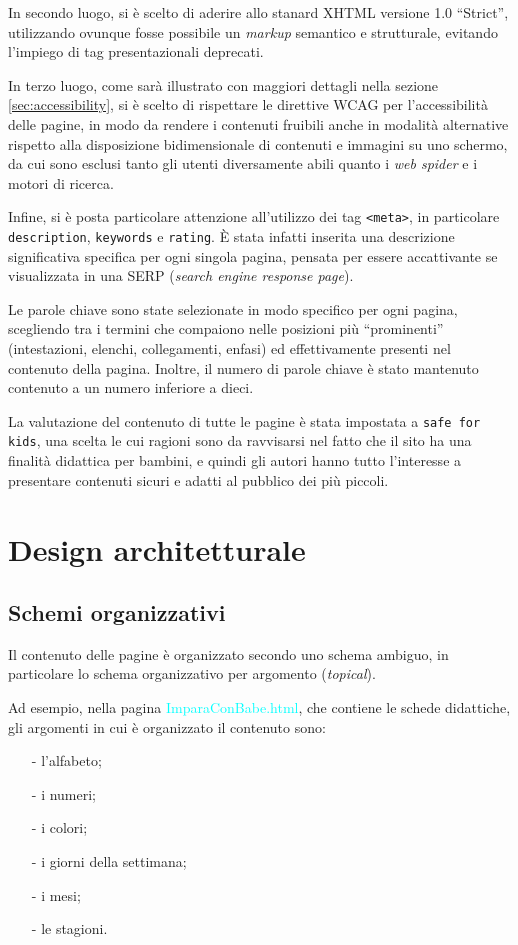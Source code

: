 \documentclass[10pt,a4paper,onecolumn]{article}
\newcommand{\sitepage}[1]{\textcolor{cyan}{\textsf{#1}}}
\newcommand{\inglese}[1]{\foreignlanguage{english}{\itshape{}#1}}
\begin{document}
In secondo luogo, si è scelto di aderire allo stanard XHTML versione 1.0 ``Strict'', utilizzando ovunque fosse possibile un \inglese{markup} semantico e strutturale, evitando l'impiego di tag presentazionali deprecati.


In terzo luogo, come sarà illustrato con maggiori dettagli nella sezione \ref{sec:accessibility}, si è scelto di rispettare le direttive WCAG per l'accessibilità delle pagine, in modo da rendere i contenuti fruibili anche in modalità alternative rispetto alla disposizione bidimensionale di contenuti e immagini su uno schermo, da cui sono esclusi tanto gli utenti diversamente abili quanto i \inglese{web spider} e i motori di ricerca.

Infine, si è posta particolare attenzione all'utilizzo dei tag \texttt{<meta>}, in particolare \texttt{description}, \texttt{keywords} e \texttt{rating}. È stata infatti inserita una descrizione significativa specifica per ogni singola pagina, pensata per essere accattivante se visualizzata in una SERP (\inglese{search engine response page}).

Le parole chiave sono state selezionate in modo specifico per ogni pagina, scegliendo tra i termini che compaiono nelle posizioni più ``prominenti'' (intestazioni, elenchi, collegamenti, enfasi) ed effettivamente presenti nel contenuto della pagina. Inoltre, il numero di parole chiave è stato mantenuto contenuto a un numero inferiore a dieci.

La valutazione del contenuto di tutte le pagine è stata impostata a \texttt{safe for kids}, una scelta le cui ragioni sono da ravvisarsi nel fatto che il sito ha una finalità didattica per bambini, e quindi gli autori hanno tutto l'interesse a presentare contenuti sicuri e adatti al pubblico dei più piccoli.

\section{Design architetturale}
\subsection{Schemi organizzativi}
Il contenuto delle pagine è organizzato secondo uno schema ambiguo, in particolare lo schema organizzativo per argomento (\inglese{topical}).

Ad esempio, nella pagina \sitepage{ImparaConBabe.html}, che contiene le schede didattiche, gli argomenti in cui è organizzato il contenuto sono:
\begin{itemize}[noitemsep,nolistsep]
  \item[-] l'alfabeto;
  \item[-] i numeri;
  \item[-] i colori;
  \item[-] i giorni della settimana;
  \item[-] i mesi;
  \item[-] le stagioni.
\end{itemize}
\end{document}
